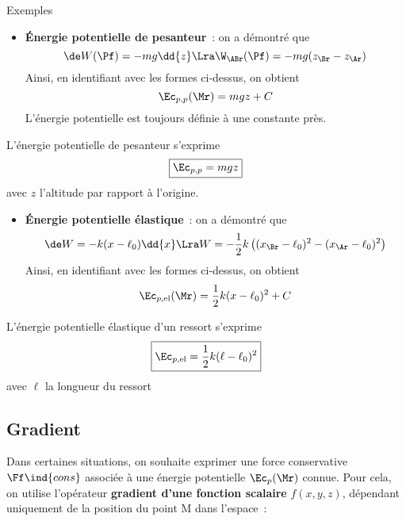 \documentclass[../main/main.tex]{subfiles}
\begin{document}
\begin{rexem}{Exemples}
    \begin{itemize}
        \item \textbf{Énergie potentielle de pesanteur}~: on a démontré que
            \[
                \de W(\Pf) = -mg\dd{z}
                \Lra
                \W_{\ABr}(\Pf) = -mg(z_\Br - z_\Ar)
            \]
            Ainsi, en identifiant avec les formes ci-dessus, on obtient
            \[\Ec_{p,p}(\Mr) = mgz + C\]
            L'énergie potentielle est toujours définie à une constante près.
    \end{itemize}
    \begin{tror}{}
        L'énergie potentielle de pesanteur s'exprime
        \[\boxed{\Ec_{p,p} = mgz}\]
        avec $z$ l'altitude par rapport à l'origine.
    \end{tror}
    \begin{itemize}
        \item \textbf{Énergie potentielle élastique}~: on a démontré que
            \[
                \de W = -k(x-\ell_0)\dd{x}
                \Lra
                W = -\frac{1}{2}k \left( (x_\Br - \ell_0)^2 - (x_\Ar
                    -\ell_0)^2\right)
            \]
            Ainsi, en identifiant avec les formes ci-dessus, on obtient
            \[\Ec_{p,\rm el}(\Mr) = \frac{1}{2}k(x-\ell_0)^2 + C\]
    \end{itemize}
    \begin{tror}{}
        L'énergie potentielle élastique d'un ressort s'exprime
        \[\boxed{\Ec_{p,\rm el} = \frac{1}{2}k(\ell-\ell_0)^2}\]
        avec $\ell$ la longueur du ressort
    \end{tror}
\end{rexem}

\vspace{-20pt}
\subsection{Gradient}
Dans certaines situations, on souhaite exprimer une force conservative
$\Ff\ind{cons}$ associée à une énergie potentielle $\Ec_p(\Mr)$ connue. Pour
cela, on utilise l'opérateur \textbf{gradient d'une fonction scalaire}
$f(x,y,z)$, dépendant uniquement de la position du point M dans l'espace~:
\end{document}
